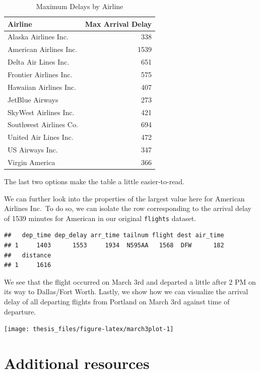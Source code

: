 \documentclass[print]{nuthesis}
\begin{document}
\begin{longtable}[t]{lr}
\caption[Max Delays by Airline]{\label{tab:maxdelays}Maximum Delays by Airline}\\
\toprule
Airline & Max Arrival Delay\\
\midrule
Alaska Airlines Inc. & 338\\
American Airlines Inc. & 1539\\
Delta Air Lines Inc. & 651\\
Frontier Airlines Inc. & 575\\
Hawaiian Airlines Inc. & 407\\
\addlinespace
JetBlue Airways & 273\\
SkyWest Airlines Inc. & 421\\
Southwest Airlines Co. & 694\\
United Air Lines Inc. & 472\\
US Airways Inc. & 347\\
\addlinespace
Virgin America & 366\\
\bottomrule
\end{longtable}

The last two options make the table a little easier-to-read.

We can further look into the properties of the largest value here for American Airlines Inc.~To do so, we can isolate the row corresponding to the arrival delay of 1539 minutes for American in our original \texttt{flights} dataset.

\begin{verbatim}
##   dep_time dep_delay arr_time tailnum flight dest air_time
## 1     1403      1553     1934  N595AA   1568  DFW      182
##   distance
## 1     1616
\end{verbatim}

We see that the flight occurred on March 3rd and departed a little after 2 PM on its way to Dallas/Fort Worth. Lastly, we show how we can visualize the arrival delay of all departing flights from Portland on March 3rd against time of departure.

\begin{center}\texttt{[image: thesis\_files/figure-latex/march3plot-1]} \end{center}

\hypertarget{additional-resources}{%
\section{Additional resources}\label{additional-resources}}
\end{document}
